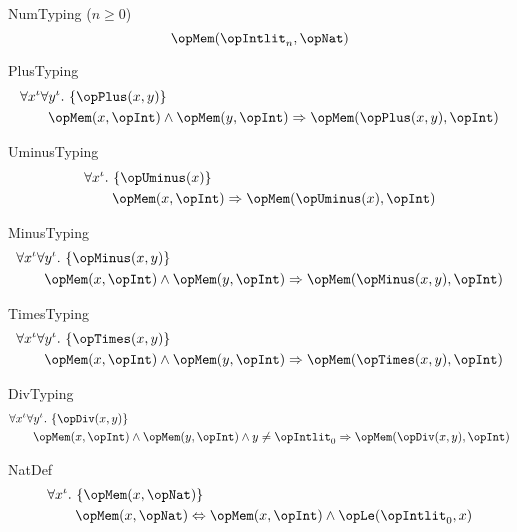 \documentclass[11pt, a4paper, oneside]{article}
\begin{document}
\begin{axioms}
\item[NumTyping ($n \ge 0$)] \[
        \opMem(\opIntlit_n, \opNat)
    \]

\item[PlusTyping] \[
        \begin{aligned}
            &\forall x^\idv \forall y^\idv.\, \st{ \opPlus(x, y) } \\
            &\qquad \opMem(x, \opInt) \wedge \opMem(y, \opInt) \imp \opMem(\opPlus(x, y), \opInt)
        \end{aligned}
    \]

\item[UminusTyping] \[
        \begin{aligned}
            &\forall x^\idv.\, \st{ \opUminus(x) } \\
            &\qquad \opMem(x, \opInt) \imp \opMem(\opUminus(x), \opInt)
        \end{aligned}
    \]

\item[MinusTyping] \[
        \begin{aligned}
            &\forall x^\idv \forall y^\idv.\, \st{ \opMinus(x, y) } \\
            &\qquad \opMem(x, \opInt) \wedge \opMem(y, \opInt) \imp \opMem(\opMinus(x, y), \opInt)
        \end{aligned}
    \]

\item[TimesTyping] \[
        \begin{aligned}
            &\forall x^\idv \forall y^\idv.\, \st{ \opTimes(x, y) } \\
            &\qquad \opMem(x, \opInt) \wedge \opMem(y, \opInt) \imp \opMem(\opTimes(x, y), \opInt)
        \end{aligned}
    \]

\item[DivTyping] \[
        \begin{aligned}
            &\forall x^\idv \forall y^\idv.\, \st{ \opDiv(x, y) } \\
            &\qquad \opMem(x, \opInt) \wedge \opMem(y, \opInt) \wedge y \neq \opIntlit_0 \imp \opMem(\opDiv(x, y), \opInt)
        \end{aligned}
    \]

\item[NatDef] \[
        \begin{aligned}
            &\forall x^\idv.\, \st{ \opMem(x, \opNat) } \\
            &\qquad \opMem(x, \opNat) \eqv \opMem(x, \opInt) \wedge \opLe(\opIntlit_0, x)
        \end{aligned}
    \]


\end{axioms}
\end{document}
